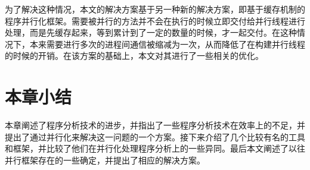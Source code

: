 为了解决这种情况，本文的解决方案基于另一种新的解决方案，即基于缓存机制的程序并行化框架。需要被并行的方法并不会在执行的时候立即交付给并行线程进行处理，而是先缓存起来，等到累计到了一定的数量的时候，才一起交付。在这种情况下，本来需要进行多次的进程间通信被缩减为一次，从而降低了在构建并行线程的时候的开销。在该方案的基础上，本文对其进行了一些相关的优化。

\section{本章小结}

本章阐述了程序分析技术的进步，并指出了一些程序分析技术在效率上的不足，并提出了通过并行化来解决这一问题的一个方案。接下来介绍了几个比较有名的工具和框架，并比较了他们在并行化处理程序分析上的一些异同。最后本文阐述了以往并行框架存在的一些确定，并提出了相应的解决方案。

